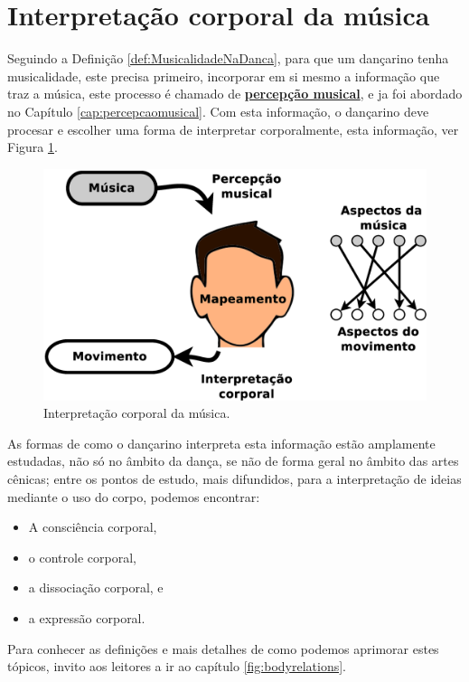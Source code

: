 \section{Interpretação corporal da música}
Seguindo a Definição \ref{def:MusicalidadeNaDanca},
para que um dançarino tenha musicalidade, este precisa primeiro,
incorporar em si mesmo a informação que traz a música, 
este processo é chamado de \hyperref[cap:percepcaomusical]{\textbf{percepção musical}}, 
e ja foi abordado no Capítulo \ref{cap:percepcaomusical}.
Com esta informação, o dançarino deve procesar e escolher uma forma de interpretar corporalmente,
esta informação, ver Figura \ref{fig:interpretacion-corporal}.
\begin{figure}[!h]
  \centering
    \includegraphics[width=1.00\textwidth]{chapters/cap-musicalidade/interpretacion-corporal.eps}
\caption{Interpretação corporal da música.}
\label{fig:interpretacion-corporal}
\end{figure}

As formas de como o dançarino interpreta esta informação estão amplamente estudadas,
não só no âmbito da dança, se não de forma geral no âmbito das artes cênicas;
entre os pontos de estudo, mais difundidos, 
para a interpretação de ideias  mediante o uso do corpo, podemos encontrar:
\begin{itemize}
\item A consciência corporal,
\item o controle corporal,
\item a dissociação corporal, e
\item a expressão corporal.
\end{itemize}
Para conhecer as definições e mais detalhes de como podemos aprimorar estes tópicos,
invito aos leitores a ir ao capítulo \ref{fig:bodyrelations}.

